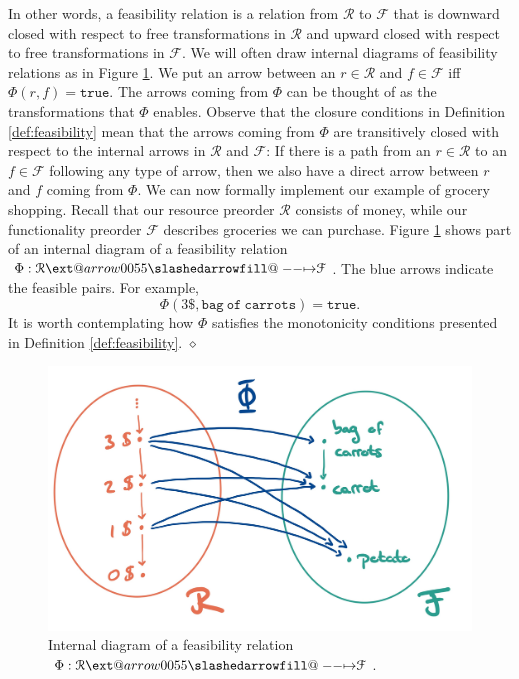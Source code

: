 \documentclass[12pt]{article}
\makeatletter
\theoremstyle{definition}
\theoremstyle{plain}
\theoremstyle{plain}
\theoremstyle{plain}
\theoremstyle{plain}
\theoremstyle{remark}
\newcommand{\continuation}{??}
\newenvironment{continueexample}[1]
{\renewcommand{\continuation}{\ref{#1}}\excont[continued]}
{\endexcont}
\newcommand\xqed[1]{%
	\leavevmode\unskip\penalty9999 \hbox{}\nobreak\hfill
	\quad\hbox{#1}}
\newcommand\exampleend{\xqed{$\diamond$}}
\theoremstyle{remark}
\newcommand{\mc}[1]{\mathcal{#1}}
\newcommand{\true}{\mathtt{true}}
\def\slashedarrowfill@#1#2#3#4#5{%
	$\m@th\thickmuskip0mu\medmuskip\thickmuskip\thinmuskip\thickmuskip
	\relax#5#1\mkern-7mu%
	\cleaders\hbox{$#5\mkern-2mu#2\mkern-2mu$}\hfill
	\mathclap{#3}\mathclap{#2}%
	\cleaders\hbox{$#5\mkern-2mu#2\mkern-2mu$}\hfill
	\mkern-7mu#4$%
}
\def\rightslashedarrowfill@{%
	\slashedarrowfill@\relbar\relbar\mapstochar\rightarrow}
\newcommand\xslashedrightarrow[2][]{%
	\ext@arrow 0055{\rightslashedarrowfill@}{#1}{#2}}
\makeatother
\begin{document}
In other words, a feasibility relation is a relation from $\mc{R}$ to $\mc{F}$ that is downward closed with respect to free transformations in $\mc{R}$ and upward closed with respect to free transformations in $\mc{F}$. We will often draw internal diagrams of feasibility relations as in Figure \ref{fig:internal feas}. We put an arrow between an $r \in \mc{R}$ and $f \in \mc{F}$ iff $\Phi(r,f) = \true$. The arrows coming from $\Phi$ can be thought of as the transformations that $\Phi$ enables. Observe that the closure conditions in Definition \ref{def:feasibility} mean that the arrows coming from $\Phi$ are transitively closed with respect to the internal arrows in $\mc{R}$ and $\mc{F}$: If there is a path from an $r \in \mc{R}$ to an $f \in \mc{F}$ following any type of arrow, then we also have a direct arrow between $r$ and $f$ coming from $\Phi$.
\newpage
\begin{continueexample}{ex:groceries}
	We can now formally implement our example of grocery shopping. Recall that our resource preorder $\mc{R}$ consists of money, while our functionality preorder $\mc{F}$ describes groceries we can purchase. Figure \ref{fig:internal feas} shows part of an internal diagram of a feasibility relation $\Phi: \mc{R} \xslashedrightarrow{} \mc{F}$. The blue arrows indicate the feasible pairs. For example, $$\Phi(3\$,\mathtt{bag\ of\ carrots}) = \true.$$ It is worth contemplating how $\Phi$ satisfies the monotonicity conditions presented in Definition \ref{def:feasibility}. 	\exampleend
	
	\begin{figure}
		\centering
		\includegraphics[width=350pt]{images/ex_groceries}
		\caption{Internal diagram of a feasibility relation $\Phi: \mc{R} \xslashedrightarrow{} \mc{F}$.}
		\label{fig:internal feas}
	\end{figure}

\end{continueexample}
\end{document}
